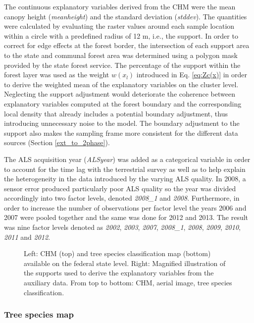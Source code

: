 The continuous explanatory variables derived from the CHM were the mean canopy height (\textit{meanheight}) and the standard deviation (\textit{stddev}). The quantities were calculated by evaluating the raster values around each sample location within a circle with a predefined radius of 12 m, i.e., the support. In order to correct for edge effects at the forest border, the intersection of each support area to the state and communal forest area was determined using a polygon mask provided by the state forest service. The percentage of the support within the forest layer was used as the weight $w(x_l)$ introduced in Eq. \ref{eq:Zc(x)} in order to derive the weighted mean of the explanatory variables on the cluster level. Neglecting the support adjustment would deteriorate the coherence between explanatory variables computed at the forest boundary and the corresponding local density that already includes a potential boundary adjustment, thus introducing unnecessary noise to the model. The boundary adjustment to the support also makes the sampling frame more consistent for the different data sources (Section \ref{ext_to_2phase}).\par
The ALS acquisition year (\textit{ALSyear}) was added as a categorical variable in order to account for the time lag with the terrestrial survey as well as to help explain the heterogeneity in the data introduced by the varying ALS quality. In 2008, a sensor error produced particularly poor ALS quality so the year was divided accordingly into two factor levels, denoted \textit{2008\_1} and \textit{2008}. Furthermore, in order to increase the number of observations per factor level the years 2006 and 2007 were pooled together and the same was done for 2012 and 2013.  The result was nine factor levels denoted as \textit{2002}, \textit{2003}, \textit{2007}, \textit{2008\_1}, \textit{2008}, \textit{2009}, \textit{2010}, \textit{2011} and \textit{2012}.

\begin{figure}[H]
	\centering
	\caption{Left: CHM (top) and tree species classification map (bottom) available on the federal state level. Right: Magnified illustration of the supports used to derive the explanatory variables from the auxiliary data. From top to bottom: CHM, aerial image, tree species classification.}
	\label{fig:Auxvars}
\end{figure}


\subsubsection{Tree species map}

